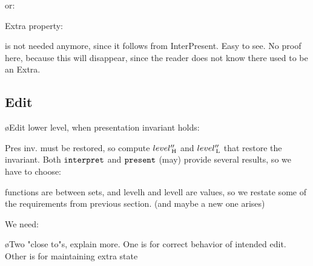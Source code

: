 
or:



Extra property:


is not needed anymore, since it follows from {\sc InterPresent}. Easy to see. No proof here, because this will disappear, since the reader does not know there used to be an {\sc Extra}.


\subsection{Edit}

\bl
\o Edit lower level, when presentation invariant holds:
\el


Pres inv. must be restored, so compute $level''_{\, \mathrm H}$ and $level''_{\, \mathrm L}$ that restore the invariant. 
Both ${\tt interpret}$ and ${\tt present}$ (may) provide several results, so we have to choose:

functions are between sets, and levelh and levell are values, so we restate some of the requirements from previous section. (and maybe a new one arises)

We need:

\bl
\o Two "close to"s, explain more. One is for correct behavior of intended edit. Other is for maintaining extra state
\el


